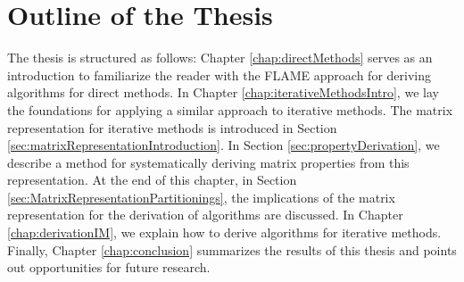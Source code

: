 \section{Outline of the Thesis}

The thesis is structured as follows: Chapter \ref{chap:directMethods} serves as an introduction to familiarize the reader with the FLAME approach for deriving algorithms for direct methods. In Chapter \ref{chap:iterativeMethodsIntro}, we lay the foundations for applying a similar approach to iterative methods. The matrix representation for iterative methods is introduced in Section \ref{sec:matrixRepresentationIntroduction}. In Section \ref{sec:propertyDerivation}, we describe a method for systematically deriving matrix properties from this representation. At the end of this chapter, in Section \ref{sec:MatrixRepresentationPartitionings}, the implications of the matrix representation for the derivation of algorithms are discussed. In Chapter \ref{chap:derivationIM}, we explain how to derive algorithms for iterative methods. Finally, Chapter \ref{chap:conclusion} summarizes the results of this thesis and points out opportunities for future research.%


%
%


%	
%



